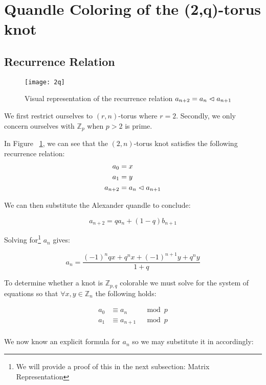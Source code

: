 \documentclass[paper.tex]{subfiles}
\begin{document}
\section{Quandle Coloring of the (2,q)-torus knot}\label{sec:2ntorus}

\subsection{Recurrence Relation}

\begin{figure}[h]
  \centering
  \texttt{[image: 2q]}
  \caption{Visual representation of the recurrence relation $a_{n+2} = a_{n} \vartriangleleft a_{n+1}$~\cite{Cusick}}\label{fig:2q}
\end{figure}

We first restrict ourselves to $(r,n)$-torus where $r = 2$. Secondly, we only concern ourselves with $\mathbb{Z}_p$ when $p > 2$ is prime.

In Figure ~\ref{fig:2q}, we can see that the $(2,n)$-torus knot satisfies the following recurrence relation:
\begin{align*}
	a_0 &= x \\
	a_1 &= y \\
	a_{n+2} &= a_{n} \vartriangleleft a_{n+1} \\
\end{align*}

We can then substitute the Alexander quandle to conclude:

$$ a_{n+2} = qa_{n} + (1-q)b_{n+1} $$

Solving for\footnote{We will provide a proof of this in the next subsection: Matrix Representation}
 $a_n$ gives:

$$a_n = \frac{(-1)^nqx+q^nx+(-1)^{n+1}y+q^ny}{1+q}$$

To determine whether a knot is $\mathbb{Z}_{p,q}$ colorable we must solve for the system of equations so that $\forall x,y \in \mathbb{Z}_n$ the following holds:

\begin{align*}
	a_0 &\equiv a_{n}  & \mod{p} \\
	a_1 &\equiv a_{n+1} & \mod{p} \\
\end{align*}

We now know an explicit formula for $a_n$ so we may substitute it in accordingly:
\end{document}

